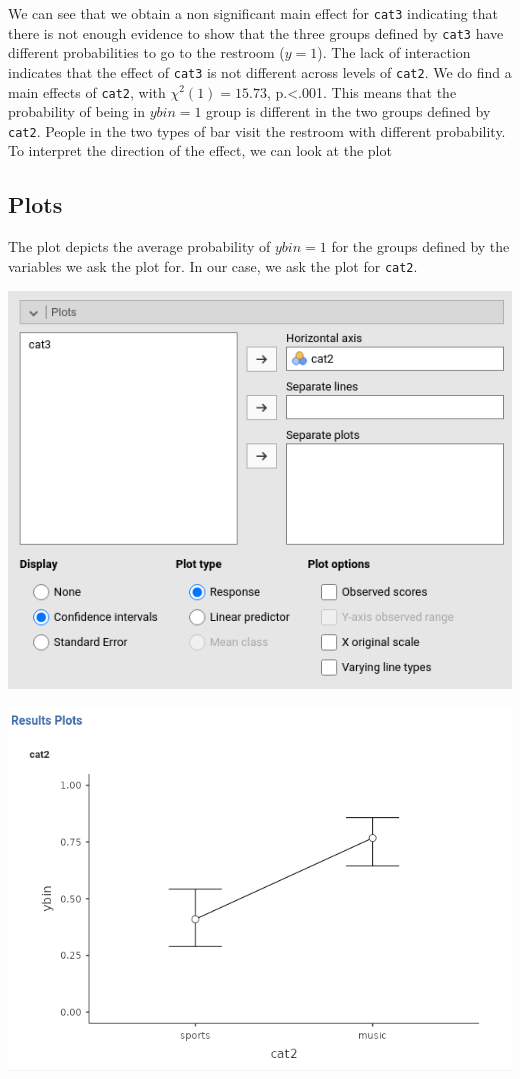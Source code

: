 \documentclass[
]{book}
\begin{document}
We can see that we obtain a non significant main effect for \texttt{cat3} indicating that there is not enough evidence to show that the three groups defined by \texttt{cat3} have different probabilities to go to the restroom (\(y=1\)). The lack of interaction indicates that the effect of \texttt{cat3} is not different across levels of \texttt{cat2}. We do find a main effects of \texttt{cat2}, with \(\chi^2(1)=15.73\), p.\textless.001. This means that the probability of being in \(ybin=1\) group is different in the two groups defined by \texttt{cat2}. People in the two types of bar visit the restroom with different probability. To interpret the direction of the effect, we can look at the plot

\hypertarget{plots-1}{%
\subsection{Plots}\label{plots-1}}

The plot depicts the average probability of \(ybin=1\) for the groups defined by the variables we ask the plot for. In our case, we ask the plot for \texttt{cat2}.

\includegraphics[width=7.81in]{bookletpics/3_logistic_input6}

\includegraphics[width=9.11in]{bookletpics/3_logistic_plot4}
\end{document}
